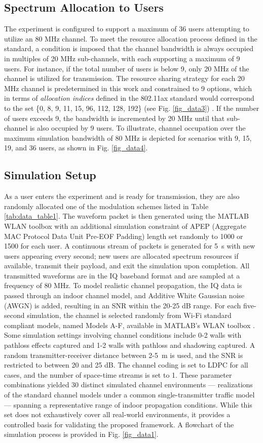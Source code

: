 \documentclass[lettersize,journal]{IEEEtran}
\begin{document}
\subsection{Spectrum Allocation to Users}
The experiment is configured to support a maximum of 36 users attempting to utilize an 80 MHz channel. To meet the resource allocation process defined in the standard, a condition is imposed that the channel bandwidth is always occupied in multiples of 20 MHz sub-channels, with each supporting a maximum of 9 users. For instance, if the total number of users is below 9, only 20 MHz of the channel is utilized for transmission. The resource sharing strategy for each 20 MHz channel is predetermined in this work and constrained to 9 options, which in terms of \textit{allocation indices} defined in the 802.11ax standard would correspond to the set \{0, 8, 9, 11, 15, 96, 112, 128, 192\} (see Fig. \ref{fig_data3}) \cite{data_ref11}. If the number of users exceeds 9, the bandwidth is incremented by 20 MHz until that sub-channel is also occupied by 9 users. To illustrate, channel occupation over the maximum simulation bandwidth of 80 MHz is depicted for scenarios with 9, 15, 19, and 36 users, as shown in Fig. \ref{fig_data4}. 

\subsection{Simulation Setup}
As a user enters the experiment and is ready for transmission, they are also randomly allocated one of the modulation schemes listed in Table \ref{tab:data_table1}. The waveform packet is then generated using the MATLAB WLAN toolbox with an additional simulation constraint of APEP (Aggregate MAC Protocol Data Unit Pre-EOF Padding) length set randomly to 1000 or 1500 for each user. A continuous stream of packets is generated for 5~s with new users appearing every second; new users are allocated spectrum resources if available, transmit their payload, and exit the simulation upon completion. All transmitted waveforms are in the IQ baseband format and are sampled at a frequency of 80 MHz. To model realistic channel propagation, the IQ data is passed through an indoor channel model, and Additive White Gaussian noise (AWGN) is added, resulting in an SNR within the 20-25 dB range. For each five-second simulation, the channel is selected randomly from Wi-Fi standard compliant models, named Models A-F, available in MATLAB’s WLAN toolbox \cite{data_ref12}. Some simulation settings involving channel conditions include 0-2 walls with pathloss effects captured and 1-2 walls with pathloss and shadowing captured. A random transmitter-receiver distance between 2-5~m is used, and the SNR is restricted to between 20 and 25 dB. The channel coding is set to LDPC for all cases, and the number of space-time streams is set to 1. These parameter combinations yielded 30 distinct simulated channel environments — realizations of the standard channel models under a common single-transmitter traffic model — spanning a representative range of indoor propagation conditions. While this set does not exhaustively cover all real-world environments, it provides a controlled basis for validating the proposed framework. A flowchart of the simulation process is provided in Fig. \ref{fig_data1}.  
\end{document}
